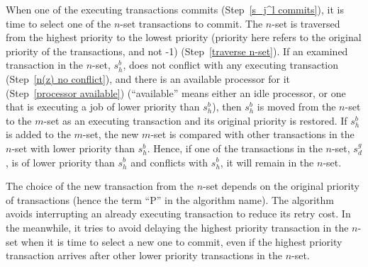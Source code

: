 When one of the executing transactions commits (Step~\ref{s_j^l commits}), it is time to select one of the $n$-set transactions to commit. The $n$-set is traversed from the highest priority
to the lowest priority (priority here refers to the
original priority of the transactions, and not -1) (Step~\ref{traverse n-set}).
%
If an examined transaction in the $n$-set, $s_{h}^{b}$,
does not conflict with any executing transaction (Step~\ref{n(z) no conflict}),
and there is an available processor for it (Step~\ref{processor available})
(``available'' means either an idle processor, or one that
is executing a job of lower priority than $s_{h}^{b}$),
then $s_{h}^{b}$ is moved from the $n$-set to the
$m$-set as an executing transaction and its original priority is restored. 
%
If $s_{h}^{b}$ is added to the $m$-set, the new $m$-set is compared with other transactions in the $n$-set with lower priority than $s_{h}^{b}$. 
Hence, if one of the transactions in the $n$-set, $s_{d}^{g}$, is of
lower priority than $s_{h}^{b}$ and conflicts with $s_{h}^{b}$,  
it will remain in the $n$-set. 

The choice of the new transaction
from the $n$-set depends on the original priority of transactions (hence the term  ``P'' in the algorithm name). The algorithm
avoids interrupting an already executing transaction to reduce its
retry cost. In the meanwhile, it tries to avoid delaying the highest priority
transaction in the $n$-set when it is time to select a new
one to commit, even if the highest priority transaction arrives after
other lower priority transactions in the $n$-set.
%
